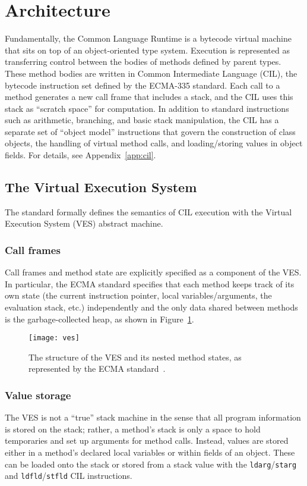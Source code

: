 \section{Architecture}
Fundamentally, the Common Language Runtime is a bytecode virtual machine that sits on top of an object-oriented type system.
Execution is represented as transferring control between the bodies of methods defined by parent types.
These method bodies are written in Common Intermediate Language (CIL), the bytecode instruction set defined by the ECMA-335 standard.
Each call to a method generates a new call frame that includes a stack, and the CIL uses this stack as ``scratch space'' for computation.
In addition to standard instructions such as arithmetic, branching, and basic stack manipulation, the CIL has a separate set of
``object model'' instructions that govern the construction of class objects, the handling of virtual method calls,
and loading/storing values in object fields.
For details, see Appendix~\ref{app:cil}.

\subsection{The Virtual Execution System}
The standard formally defines the semantics of CIL execution with the Virtual Execution System (VES) abstract machine.

\subsubsection{Call frames}
Call frames and method state are explicitly specified as a component of the VES.
In particular, the ECMA standard specifies that each method keeps track of its own state (the current instruction pointer,
local variables/arguments, the evaluation stack, etc.) independently and the only data shared between methods is the garbage-collected heap,
as shown in Figure~\ref{fig:ves}.

\begin{figure}[h]
    \texttt{[image: ves]}
    \centering
    \captionsetup{justification=centering}
    \caption{The structure of the VES and its nested method states, as represented by the ECMA standard~\cite{ecma335}.}
    \label{fig:ves}
\end{figure}

\subsubsection{Value storage}
The VES is not a ``true'' stack machine in the sense that all program information is stored on the stack;
rather, a method's stack is only a space to hold temporaries and set up arguments for method calls.
Instead, values are stored either in a method's declared local variables or within fields of an object.
These can be loaded onto the stack or stored from a stack value with the \texttt{ldarg}/\texttt{starg} and \texttt{ldfld}/\texttt{stfld}
CIL instructions.

